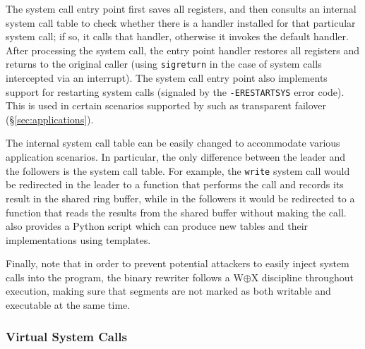 The system call entry point first saves all registers, and then
consults an internal system call table to check whether there is a
handler installed for that particular system call; if so, it calls
that handler, otherwise it invokes the default handler.  After
processing the system call, the entry point handler restores all
registers and returns to the original caller (using
\lstinline`sigreturn` in the case of system calls intercepted via an
interrupt). The system call entry point also implements support for
restarting system calls (\ie signaled by the \lstinline`-ERESTARTSYS`
error code). This is used in certain scenarios supported by \varan
such as transparent failover (\S\ref{sec:applications}).

The internal system call table can be easily changed to accommodate
various application scenarios.  In particular, the only difference
between the leader and the followers is the system call table. For
example, the \lstinline`write` system call would be redirected in the leader
to a function that performs the call and records its result in the
shared ring buffer, while in the followers it would be redirected to a
function that reads the results from the shared buffer without making
the call.
\varan  also provides a Python script which can produce new tables
and their implementations using templates.

Finally, note that in order to prevent potential attackers to easily inject
system calls into the program, the binary rewriter follows a
W$\mathbin{\oplus}$X discipline throughout execution, making sure that
segments are not marked as both writable and executable at the same
time.


\subsubsection{Virtual System Calls}
\label{sec:vsyscall}

